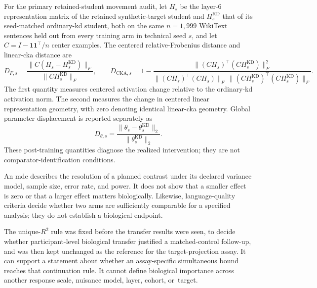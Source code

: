 For the primary retained-student movement audit, let \(H_s\) be the layer-6 representation matrix of the retained synthetic-target student and \(H_s^{\mathrm{KD}}\) that of its seed-matched ordinary-\ac{kd} student, both on the same \(n=1{,}999\) WikiText sentences held out from every training arm in technical seed \(s\), and let \(C=I-\mathbf{1}\mathbf{1}^{\top}/n\) center examples.
The centered relative-Frobenius distance and linear-\ac{cka} distance are
\begin{equation}
D_{F,s}
=
\frac{\lVert C(H_s-H_s^{\mathrm{KD}})\rVert_F}
{\lVert C H_s^{\mathrm{KD}}\rVert_F},
\qquad
D_{\mathrm{CKA},s}
=
1-
\frac{\lVert (CH_s)^{\top}(CH_s^{\mathrm{KD}})\rVert_F^2}
{\lVert (CH_s)^{\top}(CH_s)\rVert_F\,
 \lVert (CH_s^{\mathrm{KD}})^{\top}(CH_s^{\mathrm{KD}})\rVert_F}.
\label{eq:movement-distances}
\end{equation}
The first quantity measures centered activation change relative to the ordinary-\ac{kd} activation norm.
The second measures the change in centered linear representation geometry, with zero denoting identical linear-\ac{cka} geometry.
Global parameter displacement is reported separately as
\begin{equation}
D_{\theta,s}
=
\frac{\lVert\theta_s-\theta_s^{\mathrm{KD}}\rVert_2}
{\lVert\theta_s^{\mathrm{KD}}\rVert_2}.
\label{eq:parameter-displacement}
\end{equation}
These post-training quantities diagnose the realized intervention; they are not comparator-identification conditions.

An \ac{mde} describes the resolution of a planned contrast under its declared variance model, sample size, error rate, and power.
It does not show that a smaller effect is zero or that a larger effect matters biologically.
Likewise, language-quality criteria decide whether two arms are sufficiently comparable for a specified analysis; they do not establish a biological endpoint.

The  unique-\(R^2\) rule was fixed before the transfer results were seen, to decide whether participant-level biological transfer justified a matched-control follow-up, and was then kept unchanged as the reference for the target-projection assay. 
It can support a statement about whether an assay-specific simultaneous bound reaches that continuation rule.
It cannot define biological importance across another response scale, nuisance model, layer, cohort, or~target.

